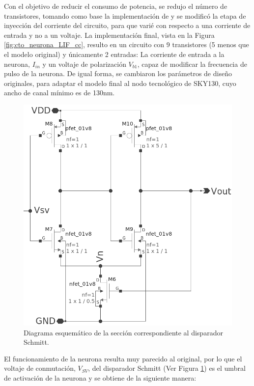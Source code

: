 \documentclass[conference]{IEEEtran}
\begin{document}
Con el objetivo de reducir el consumo de potencia, se redujo el número de transistores, tomando como base la implementación de \cite{Vohra_2023} y se modificó la etapa de inyección del corriente del circuito, para que varié con respecto a una corriente de entrada y no a un voltaje. La implementación final, vista en la Figura \ref{fig:cto_neurona_LIF_cc}, resulto en un circuito con 9 transistores (5 menos que el modelo original) y únicamente 2 entradas: La corriente de entrada a la neurona, $I_{in}$ y un voltaje de polarización $V_{b1}$, capaz de modificar la frecuencia de pulso de la neurona. De igual forma, se cambiaron los parámetros de diseño originales, para adaptar el modelo final al nodo tecnológico de SKY130, cuyo ancho de canal mínimo es de 130nm.

\begin{figure}[ht]
	\centering
	\includegraphics[scale=0.17]{img/schmitt_trigger.png}
	\caption{Diagrama esquemático de la sección correspondiente al disparador Schmitt.
		\label{fig:schmitt_trigger}}
\end{figure}

El funcionamiento de la neurona resulta muy parecido al original, por lo que el voltaje de conmutación, $V_{SV}$, del disparador Schmitt (Ver Figura \ref{fig:schmitt_trigger}) es el umbral de activación de la neurona \cite{Vohra_2024} y se obtiene de la siguiente manera:
\end{document}
